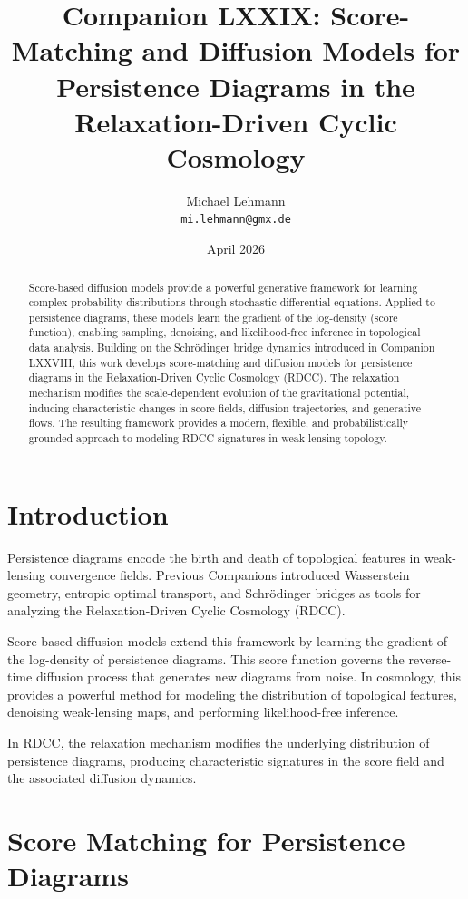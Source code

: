 \documentclass[11pt,a4paper]{article}
\title{\textbf{Companion LXXIX: Score-Matching and Diffusion Models for Persistence Diagrams in the Relaxation-Driven Cyclic Cosmology}}
\author{Michael Lehmann \\ \texttt{mi.lehmann@gmx.de}}
\date{April 2026}
\begin{document}
\maketitle

\begin{abstract}
Score-based diffusion models provide a powerful generative framework for learning 
complex probability distributions through stochastic differential equations. 
Applied to persistence diagrams, these models learn the gradient of the log-density 
(score function), enabling sampling, denoising, and likelihood-free inference in 
topological data analysis. Building on the Schrödinger bridge dynamics introduced 
in Companion LXXVIII, this work develops score-matching and diffusion models for 
persistence diagrams in the Relaxation-Driven Cyclic Cosmology (RDCC). The 
relaxation mechanism modifies the scale-dependent evolution of the gravitational 
potential, inducing characteristic changes in score fields, diffusion trajectories, 
and generative flows. The resulting framework provides a modern, flexible, and 
probabilistically grounded approach to modeling RDCC signatures in weak-lensing 
topology.
\end{abstract}
\section{Introduction}

Persistence diagrams encode the birth and death of topological features in weak-
lensing convergence fields. Previous Companions introduced Wasserstein geometry, 
entropic optimal transport, and Schrödinger bridges as tools for analyzing the 
Relaxation-Driven Cyclic Cosmology (RDCC).

Score-based diffusion models extend this framework by learning the gradient of the 
log-density of persistence diagrams. This score function governs the reverse-time 
diffusion process that generates new diagrams from noise. In cosmology, this 
provides a powerful method for modeling the distribution of topological features, 
denoising weak-lensing maps, and performing likelihood-free inference.

In RDCC, the relaxation mechanism modifies the underlying distribution of 
persistence diagrams, producing characteristic signatures in the score field and 
the associated diffusion dynamics.
\section{Score Matching for Persistence Diagrams}
\end{document}
